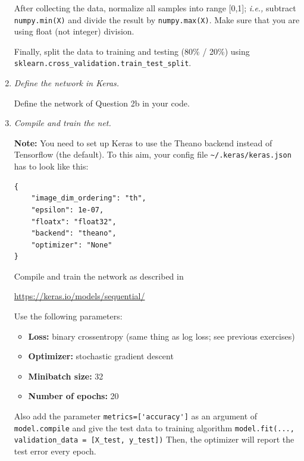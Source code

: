 \documentclass[a4paper,12pt]{scrartcl}
\newcommand{\python}{{\fbox{\texttt{\bfseries python}}\quad}}
\begin{document}
\begin{enumerate}
After collecting the data, normalize all samples into range [0,1];
\emph{i.e.,} subtract \verb+numpy.min(X)+ and divide the result
by \verb+numpy.max(X)+. Make sure that you are using float (not integer)
division.

Finally, split the data to training and testing (80\% / 20\%)
using \verb+sklearn.cross_validation.train_test_split+.

\item \python \emph{Define the network in Keras.}

Define the network of Question 2b in your code.

\item \python \emph{Compile and train the net.}

\textbf{Note:} You need to set up Keras to use the Theano backend instead of
Tensorflow (the default). To this aim, your config file \verb+~/.keras/keras.json+
has to look like this:
\begin{verbatim}
{
    "image_dim_ordering": "th", 
    "epsilon": 1e-07, 
    "floatx": "float32", 
    "backend": "theano",
    "optimizer": "None"
}
\end{verbatim}

Compile and train the network as described in 

\url{https://keras.io/models/sequential/}

Use the following parameters:
\begin{itemize}
	\item \textbf{Loss:} binary crossentropy (same thing as log loss; see previous exercises)
	\item \textbf{Optimizer:} stochastic gradient descent
	\item \textbf{Minibatch size:} 32
	\item \textbf{Number of epochs:} 20
\end{itemize}
Also add the parameter \verb+metrics=['accuracy']+ as an argument of
\verb+model.compile+ and give the test data to training algorithm
\verb+model.fit(..., validation_data = [X_test, y_test])+
Then, the optimizer will report the test error every epoch.
\end{enumerate}
\end{document}
